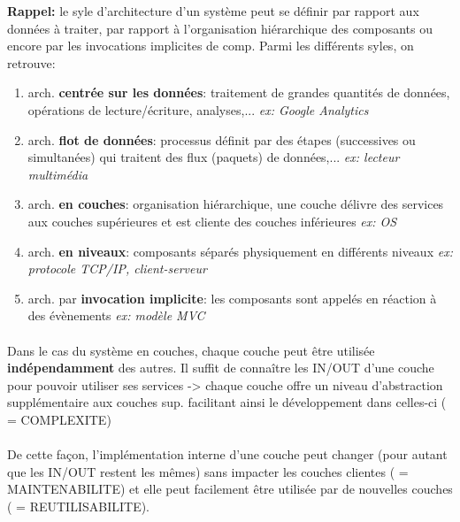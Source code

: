 \item{}
{\vrai}
{\textbf{Rappel:} le syle d'architecture d'un système peut se définir par rapport aux données à traiter, par rapport à l'organisation hiérarchique des composants ou encore par les invocations implicites de comp. Parmi les différents syles, on retrouve:
\begin{enumerate}
\item arch. \textbf{centrée sur les données}: traitement de grandes quantités de données, opérations de lecture/écriture, analyses,... \textit{ex: Google Analytics}
\item arch. \textbf{flot de données}: processus définit par des étapes (successives ou simultanées) qui traitent des flux (paquets) de données,... \textit{ex: lecteur multimédia}
\item arch. \textbf{en couches}: organisation hiérarchique, une couche délivre des services aux couches supérieures et est cliente des couches inférieures \textit{ex: OS}
\item arch. \textbf{en niveaux}: composants séparés physiquement en différents niveaux \textit{ex: protocole TCP/IP, client-serveur}
\item arch. par \textbf{invocation implicite}: les composants sont appelés en réaction à des évènements \textit{ex: modèle MVC }
\end{enumerate} 
\paragraph{}
Dans le cas du système en couches, chaque couche peut être utilisée \textbf{indépendamment} des autres. Il suffit de connaître les IN/OUT d'une couche pour pouvoir utiliser ses services -> chaque couche offre un niveau d'abstraction supplémentaire aux couches sup. facilitant ainsi le développement dans celles-ci ( = COMPLEXITE)
\paragraph{}
De cette façon, l'implémentation interne d'une couche peut changer (pour autant que les IN/OUT restent les mêmes) sans impacter les couches clientes ( = MAINTENABILITE) et elle peut facilement être utilisée par de nouvelles couches ( = REUTILISABILITE).
}



